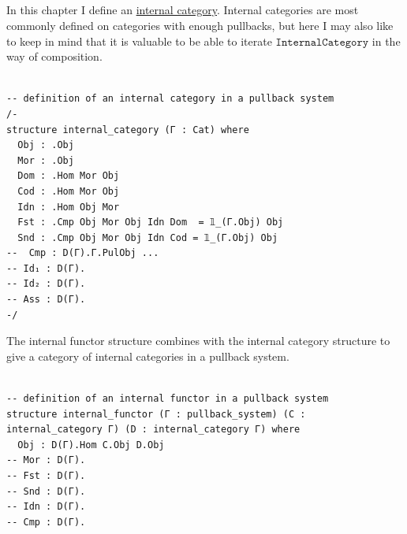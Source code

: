\documentclass{book}
\theoremstyle{definition}
\newcounter{pcounter}
\newcounter{lcounter}
\newcounter{sectioncount}
\newcounter{subsectioncount}
\renewcommand{\section}[1]{\newpage\ \\ \ \\ \begin{center} \scalebox{1.5}{\texttt{\thesectioncount . #1}} \stepcounter{sectioncount} \setcounter{subsectioncount}{1} \end{center} \begin{center} \ \\ \ \\ \thispagestyle{empty} \end{center}}
\begin{document}

\section{\texttt{InternalCategory Γ}}

In this chapter I define an \href{https://ncatlab.org/nlab/show/internal+category}{internal category}. Internal categories are most commonly defined on categories with enough pullbacks, but here I may also like to keep in mind that it is valuable to be able to iterate $\texttt{InternalCategory}$ in the way of composition.\\

\begin{center}
\begin{tcolorbox}[width=5in,colback={white},title={\begin{center}\texttt{Lean \thelcounter} \addtocounter{lcounter}{1}  \end{center}},colbacktitle=Blue,coltitle=black]
\begin{verbatim}

-- definition of an internal category in a pullback system
/-
structure internal_category (Γ : Cat) where
  Obj : .Obj
  Mor : .Obj
  Dom : .Hom Mor Obj
  Cod : .Hom Mor Obj
  Idn : .Hom Obj Mor
  Fst : .Cmp Obj Mor Obj Idn Dom  = 𝟙_(Γ.Obj) Obj
  Snd : .Cmp Obj Mor Obj Idn Cod = 𝟙_(Γ.Obj) Obj
--  Cmp : D(Γ).Γ.PulObj ...
-- Id₁ : D(Γ).
-- Id₂ : D(Γ).
-- Ass : D(Γ).
-/

\end{verbatim}
\end{tcolorbox}
\end{center}

The internal functor structure combines with the internal category structure to give a category of internal categories in a pullback system.\\

\begin{center}
\begin{tcolorbox}[width=5in,colback={white},title={\begin{center}\texttt{Lean \thelcounter} \addtocounter{lcounter}{1}  \end{center}},colbacktitle=Blue,coltitle=black]
\begin{verbatim}

-- definition of an internal functor in a pullback system
structure internal_functor (Γ : pullback_system) (C : internal_category Γ) (D : internal_category Γ) where
  Obj : D(Γ).Hom C.Obj D.Obj
-- Mor : D(Γ).
-- Fst : D(Γ).
-- Snd : D(Γ).
-- Idn : D(Γ).
-- Cmp : D(Γ).

\end{verbatim}
\end{tcolorbox}
\end{center}
\end{document}
